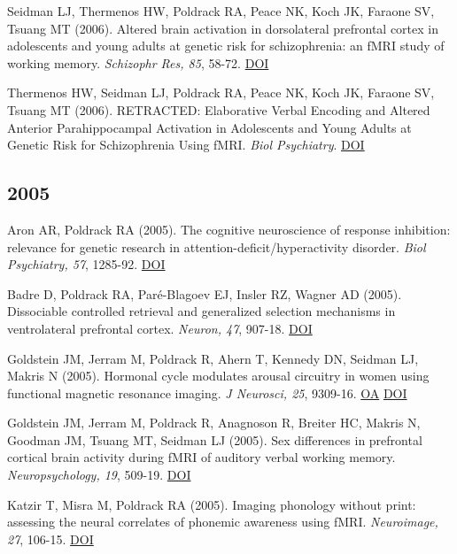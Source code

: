\documentclass[10pt, letterpaper]{article}
\begin{document}
Seidman LJ, Thermenos HW, Poldrack RA, Peace NK, Koch JK, Faraone SV, Tsuang MT (2006). Altered brain activation in dorsolateral prefrontal cortex in adolescents and young adults at genetic risk for schizophrenia: an fMRI study of working memory. \textit{Schizophr Res, 85}, 58-72. \href{http://dx.doi.org/10.1016/j.schres.2006.03.019}{DOI} \vspace{2mm}

Thermenos HW, Seidman LJ, Poldrack RA, Peace NK, Koch JK, Faraone SV, Tsuang MT (2006). RETRACTED: Elaborative Verbal Encoding and Altered Anterior Parahippocampal Activation in Adolescents and Young Adults at Genetic Risk for Schizophrenia Using fMRI. \textit{Biol Psychiatry}. \href{http://dx.doi.org/10.1016/j.biopsych.2006.04.032}{DOI} \vspace{2mm}

\subsection*{2005}Aron AR, Poldrack RA (2005). The cognitive neuroscience of response inhibition: relevance for genetic research in attention-deficit/hyperactivity disorder. \textit{Biol Psychiatry, 57}, 1285-92. \href{http://dx.doi.org/10.1016/j.biopsych.2004.10.026}{DOI} \vspace{2mm}

Badre D, Poldrack RA, Paré-Blagoev EJ, Insler RZ, Wagner AD (2005). Dissociable controlled retrieval and generalized selection mechanisms in ventrolateral prefrontal cortex. \textit{Neuron, 47}, 907-18. \href{http://dx.doi.org/10.1016/j.neuron.2005.07.023}{DOI} \vspace{2mm}

Goldstein JM, Jerram M, Poldrack R, Ahern T, Kennedy DN, Seidman LJ, Makris N (2005). Hormonal cycle modulates arousal circuitry in women using functional magnetic resonance imaging. \textit{J Neurosci, 25}, 9309-16. \href{https://www.ncbi.nlm.nih.gov/pmc/articles/PMC6725775}{OA} \href{http://dx.doi.org/10.1523/jneurosci.2239-05.2005}{DOI} \vspace{2mm}

Goldstein JM, Jerram M, Poldrack R, Anagnoson R, Breiter HC, Makris N, Goodman JM, Tsuang MT, Seidman LJ (2005). Sex differences in prefrontal cortical brain activity during fMRI of auditory verbal working memory. \textit{Neuropsychology, 19}, 509-19. \href{http://dx.doi.org/10.1037/0894-4105.19.4.509}{DOI} \vspace{2mm}

Katzir T, Misra M, Poldrack RA (2005). Imaging phonology without print: assessing the neural correlates of phonemic awareness using fMRI. \textit{Neuroimage, 27}, 106-15. \href{http://dx.doi.org/10.1016/j.neuroimage.2005.04.013}{DOI} \vspace{2mm}
\end{document}
